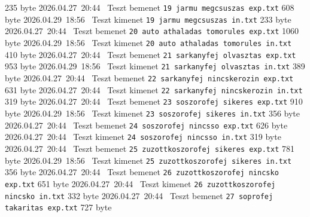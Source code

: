 \begin{fajllista}
    {235 byte} %
    {2026.04.27~20:44~} %
    {Teszt bemenet} %
    \fajl
    {\texttt{19 jarmu megcsuszas exp.txt}} %
    {608 byte} %
    {2026.04.29~18:56~} %
    {Teszt kimenet} %
    \fajl
    {\texttt{19 jarmu megcsuszas in.txt}} %
    {233 byte} %
    {2026.04.27~20:44~} %
    {Teszt bemenet} %
    \fajl
    {\texttt{20 auto athaladas tomorules exp.txt}} %
    {1060 byte} %
    {2026.04.29~18:56~} %
    {Teszt kimenet} %
    \fajl
    {\texttt{20 auto athaladas tomorules in.txt}} %
    {410 byte} %
    {2026.04.27~20:44~} %
    {Teszt bemenet} %
    \fajl
    {\texttt{21 sarkanyfej olvasztas exp.txt}} %
    {953 byte} %
    {2026.04.29~18:56~} %
    {Teszt kimenet} %
    \fajl
    {\texttt{21 sarkanyfej olvasztas in.txt}} %
    {389 byte} %
    {2026.04.27~20:44~} %
    {Teszt bemenet} %
    \fajl
    {\texttt{22 sarkanyfej nincskerozin exp.txt}} %
    {631 byte} %
    {2026.04.27~20:44~} %
    {Teszt kimenet} %
    \fajl
    {\texttt{22 sarkanyfej nincskerozin in.txt}} %
    {319 byte} %
    {2026.04.27~20:44~} %
    {Teszt bemenet} %
    \fajl
    {\texttt{23 soszorofej sikeres exp.txt}} %
    {910 byte} %
    {2026.04.29~18:56~} %
    {Teszt kimenet} %
    \fajl
    {\texttt{23 soszorofej sikeres in.txt}} %
    {356 byte} %
    {2026.04.27~20:44~} %
    {Teszt bemenet} %
    \fajl
    {\texttt{24 soszorofej nincsso exp.txt}} %
    {626 byte} %
    {2026.04.27~20:44~} %
    {Teszt kimenet} %
    \fajl
    {\texttt{24 soszorofej nincsso in.txt}} %
    {319 byte} %
    {2026.04.27~20:44~} %
    {Teszt bemenet} %
    \fajl
    {\texttt{25 zuzottkoszorofej sikeres exp.txt}} %
    {781 byte} %
    {2026.04.29~18:56~} %
    {Teszt kimenet} %
    \fajl
    {\texttt{25 zuzottkoszorofej sikeres in.txt}} %
    {356 byte} %
    {2026.04.27~20:44~} %
    {Teszt bemenet} %
    \fajl
    {\texttt{26 zuzottkoszorofej nincsko exp.txt}} %
    {651 byte} %
    {2026.04.27~20:44~} %
    {Teszt kimenet} %
    \fajl
    {\texttt{26 zuzottkoszorofej nincsko in.txt}} %
    {332 byte} %
    {2026.04.27~20:44~} %
    {Teszt bemenet} %
    \fajl
    {\texttt{27 soprofej takaritas exp.txt}} %
    {727 byte} %

\end{fajllista}
